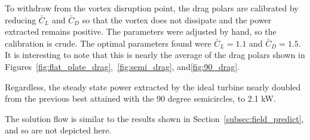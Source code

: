To withdraw from the vortex disruption point, the drag
polars are calibrated by reducing $\bar C_L $ and $\bar C_D$ so that the 
vortex does not dissipate and the power extracted remains positive. The
parameters were adjusted by hand, so the calibration is crude. The
optimal parameters found were $\bar C_L = 1.1$ and $\bar C_D = 1.5$. It
is interesting to note that this is nearly the average of the drag
polars shown in
Figures~\ref{fig:flat_plate_drag},~\ref{fig:semi_drag},
and\ref{fig:90_drag}.  

Regardless, the steady state power extracted by the ideal turbine nearly 
doubled from the previous best attained with the 90 degree semicircles,
to 2.1 kW. 

The solution flow is similar to the results shown in
Section~\ref{subsec:field_predict}, and so are not depicted here.

